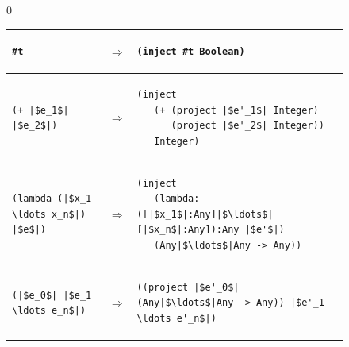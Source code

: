 \documentclass[7x10,nocrop]{TimesAPriori_MIT}%
\def\racketEd{0}
\def\edition{0}
\begin{document}
\begin{figure}[btp]
\centering
{\if\edition\racketEd
\begin{tabular}{|lll|} \hline
\begin{minipage}{0.27\textwidth}
\begin{lstlisting}
#t
\end{lstlisting}
\end{minipage}
&
$\Rightarrow$
&
\begin{minipage}{0.65\textwidth}
\begin{lstlisting}
(inject #t Boolean)
\end{lstlisting}
\end{minipage}
\\[2ex]\hline
\begin{minipage}{0.27\textwidth}
\begin{lstlisting}
(+ |$e_1$| |$e_2$|)
\end{lstlisting}
\end{minipage}
&
$\Rightarrow$
&
\begin{minipage}{0.65\textwidth}
\begin{lstlisting}
(inject
   (+ (project |$e'_1$| Integer)
      (project |$e'_2$| Integer))
   Integer)
\end{lstlisting}
\end{minipage}
\\[2ex]\hline
\begin{minipage}{0.27\textwidth}
\begin{lstlisting}
(lambda (|$x_1 \ldots x_n$|) |$e$|)
\end{lstlisting}
\end{minipage}
&
$\Rightarrow$
&
\begin{minipage}{0.65\textwidth}
\begin{lstlisting}
(inject
   (lambda: ([|$x_1$|:Any]|$\ldots$|[|$x_n$|:Any]):Any |$e'$|)
   (Any|$\ldots$|Any -> Any))
\end{lstlisting}
\end{minipage}
\\[2ex]\hline
\begin{minipage}{0.27\textwidth}
\begin{lstlisting}
(|$e_0$| |$e_1 \ldots e_n$|)
\end{lstlisting}
\end{minipage}
&
$\Rightarrow$
&
\begin{minipage}{0.65\textwidth}
\begin{lstlisting}
((project |$e'_0$| (Any|$\ldots$|Any -> Any)) |$e'_1 \ldots e'_n$|)

\end{lstlisting}
\end{minipage}
\end{tabular}}
\end{figure}
\end{document}
